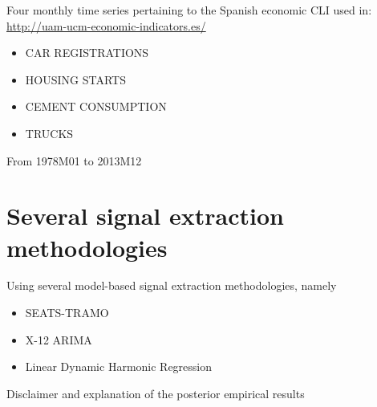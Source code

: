 \begin{slide}

  Four monthly time series pertaining to the Spanish economic CLI used
  in: \url{http://uam-ucm-economic-indicators.es/}
  \bigskip
  
  \begin{itemize}
  \item CAR REGISTRATIONS
  \item HOUSING STARTS
  \item CEMENT CONSUMPTION
  \item TRUCKS
  \end{itemize}
  \bigskip

  From 1978M01 to 2013M12
\end{slide}

\begin{slide}
  \begin{center}
  \end{center}
\end{slide}


\section[Methodologies]{Several signal extraction methodologies}

\begin{slide}
  Using several model-based signal extraction methodologies, namely

  \begin{itemize}
  \item SEATS-TRAMO
  \item X-12 ARIMA
  \item Linear Dynamic Harmonic Regression \citep{Bujosa:CSDA-52-999}
  \end{itemize}

  Disclaimer and explanation of the posterior empirical results
\end{slide}

